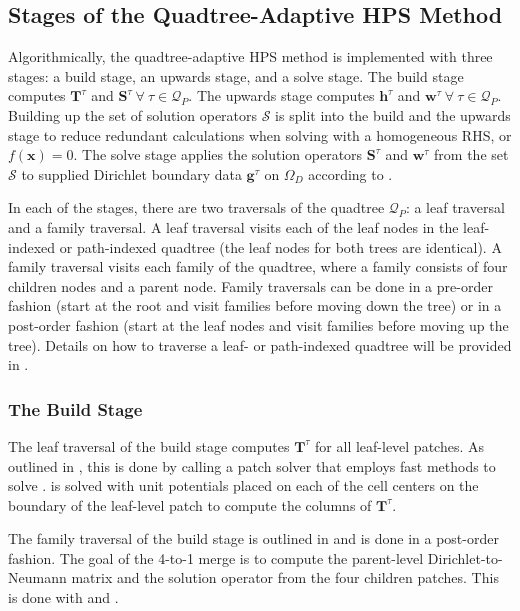 \subsection{Stages of the Quadtree-Adaptive HPS Method}
\label{sub:stages-of-the-quadtree-adaptive-hps-method}

Algorithmically, the quadtree-adaptive HPS method is implemented with three stages: a build stage, an upwards stage, and a solve stage. The build stage computes $\textbf{T}^{\tau}$ and $\textbf{S}^{\tau}\ \forall\ \tau \in \mathcal{Q}_P$. The upwards stage computes $\textbf{h}^{\tau}$ and $\textbf{w}^{\tau}\ \forall\ \tau \in \mathcal{Q}_P$. Building up the set of solution operators $\mathcal{S}$ is split into the build and the upwards stage to reduce redundant calculations when solving  with a homogeneous RHS, or $f(\textbf{x}) = 0$. The solve stage applies the solution operators $\textbf{S}^{\tau}$ and $\textbf{w}^{\tau}$ from the set $\mathcal{S}$ to supplied  Dirichlet boundary data $\textbf{g}^{\tau}$ on $\Omega_D$  according to .

In each of the stages, there are two traversals of the quadtree $\mathcal{Q}_P$: a leaf traversal and a family traversal. A leaf traversal visits each of the leaf nodes in the leaf-indexed or path-indexed quadtree (the leaf nodes for both trees are identical). A family traversal visits each family of the quadtree, where a family consists of four children nodes and a parent node. Family traversals can be done in a pre-order fashion (start at the root and visit families before moving down the tree) or in a post-order fashion (start at the leaf nodes and visit families before moving up the tree). Details on how to traverse a leaf- or path-indexed quadtree will be provided in .

\subsubsection{The Build Stage}

The leaf traversal of the build stage computes $\textbf{T}^{\tau}$ for all leaf-level patches. As outlined in \cite{chipman2024fast}, this is done by calling a patch solver that employs fast methods to solve .  is solved with unit potentials placed on each of the cell centers on the boundary of the leaf-level patch to compute the columns of $\textbf{T}^{\tau}$.

The family traversal of the build stage is outlined in  and is done in a post-order fashion. The goal of the 4-to-1 merge is to compute the parent-level Dirichlet-to-Neumann matrix and the solution operator from the four children patches. This is done with  and .

